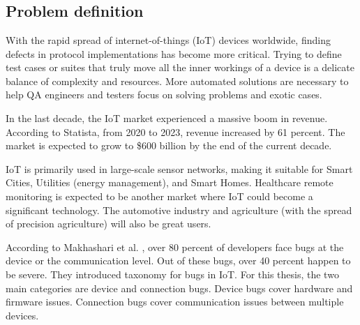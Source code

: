 \chapter{\bevezetes}



\section{Problem definition}

With the rapid spread of internet-of-things (IoT) devices worldwide, finding defects in protocol implementations has become more critical. Trying to define test cases or suites that truly move all the inner workings of a device is a delicate balance of complexity and resources. More automated solutions are necessary to help QA engineers and testers focus on solving problems and exotic cases.

In the last decade, the IoT market experienced a massive boom in revenue. According to Statista\cite{statista:revenue:2023}, from 2020 to 2023, revenue increased by 61 percent. The market is expected to grow to \$600 billion by the end of the current decade.

IoT is primarily used in large-scale sensor networks, making it suitable for Smart Cities, Utilities (energy management), and Smart Homes\cite{9210375}. Healthcare remote monitoring is expected to be another market where IoT could become a significant technology. The automotive industry and agriculture\cite{8883163, 9681084} (with the spread of precision agriculture) will also be great users.

According to Makhashari et al. \cite{9402092}, over 80 percent of developers face bugs at the device or the communication level. Out of these bugs, over 40 percent happen to be severe. They introduced taxonomy for bugs in IoT. For this thesis, the two main categories are device and connection bugs. Device bugs cover hardware and firmware issues. Connection bugs cover communication issues between multiple devices.

